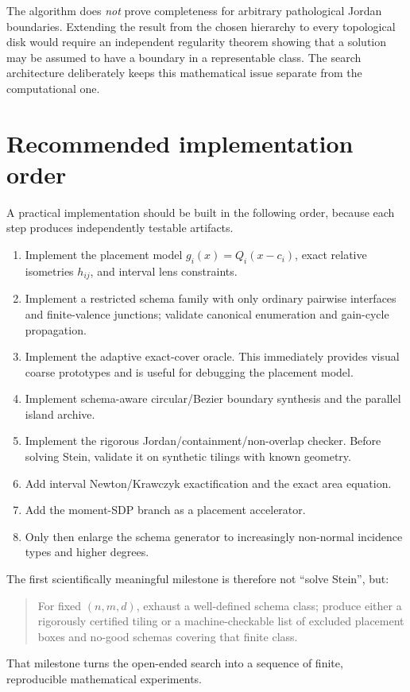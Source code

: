 \documentclass[11pt]{article}
\begin{document}
The algorithm does \emph{not} prove completeness for arbitrary pathological Jordan boundaries. Extending the result from the chosen hierarchy to every topological disk would require an independent regularity theorem showing that a solution may be assumed to have a boundary in a representable class. The search architecture deliberately keeps this mathematical issue separate from the computational one.

\section{Recommended implementation order}

A practical implementation should be built in the following order, because each step produces independently testable artifacts.

\begin{enumerate}[leftmargin=9mm]
\item Implement the placement model $g_i(x)=Q_i(x-c_i)$, exact relative isometries $h_{ij}$, and interval lens constraints.
\item Implement a restricted schema family with only ordinary pairwise interfaces and finite-valence junctions; validate canonical enumeration and gain-cycle propagation.
\item Implement the adaptive exact-cover oracle. This immediately provides visual coarse prototypes and is useful for debugging the placement model.
\item Implement schema-aware circular/Bezier boundary synthesis and the parallel island archive.
\item Implement the rigorous Jordan/containment/non-overlap checker. Before solving Stein, validate it on synthetic tilings with known geometry.
\item Add interval Newton/Krawczyk exactification and the exact area equation.
\item Add the moment-SDP branch as a placement accelerator.
\item Only then enlarge the schema generator to increasingly non-normal incidence types and higher degrees.
\end{enumerate}

The first scientifically meaningful milestone is therefore not ``solve Stein'', but:
\begin{quote}
For fixed $(n,m,d)$, exhaust a well-defined schema class; produce either a rigorously certified tiling or a machine-checkable list of excluded placement boxes and no-good schemas covering that finite class.
\end{quote}
That milestone turns the open-ended search into a sequence of finite, reproducible mathematical experiments.
\end{document}
